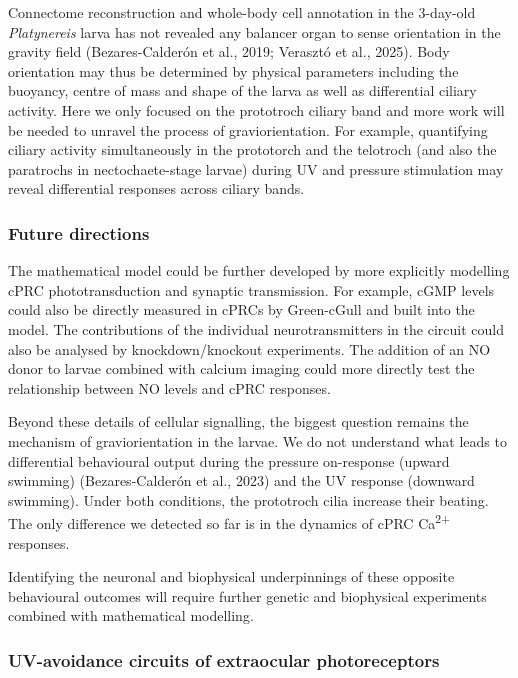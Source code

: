 \documentclass[
  11pt,
  letterpaper,
  DIV=11,
  numbers=noendperiod]{scrartcl}
\begin{document}
Connectome reconstruction and whole-body cell annotation in the
3-day-old \emph{Platynereis} larva has not revealed any balancer organ
to sense orientation in the gravity field (Bezares-Calderón et al.,
2019; Verasztó et al., 2025). Body orientation may thus be determined by
physical parameters including the buoyancy, centre of mass and shape of
the larva as well as differential ciliary activity. Here we only focused
on the prototroch ciliary band and more work will be needed to unravel
the process of graviorientation. For example, quantifying ciliary
activity simultaneously in the prototorch and the telotroch (and also
the paratrochs in nectochaete-stage larvae) during UV and pressure
stimulation may reveal differential responses across ciliary bands.

\subsubsection{Future directions}\label{future-directions}

The mathematical model could be further developed by more explicitly
modelling cPRC phototransduction and synaptic transmission. For example,
cGMP levels could also be directly measured in cPRCs by Green-cGull and
built into the model. The contributions of the individual
neurotransmitters in the circuit could also be analysed by
knockdown/knockout experiments. The addition of an NO donor to larvae
combined with calcium imaging could more directly test the relationship
between NO levels and cPRC responses.

Beyond these details of cellular signalling, the biggest question
remains the mechanism of graviorientation in the larvae. We do not
understand what leads to differential behavioural output during the
pressure on-response (upward swimming) (Bezares-Calderón et al., 2023)
and the UV response (downward swimming). Under both conditions, the
prototroch cilia increase their beating. The only difference we detected
so far is in the dynamics of cPRC Ca\textsuperscript{2+} responses.

Identifying the neuronal and biophysical underpinnings of these opposite
behavioural outcomes will require further genetic and biophysical
experiments combined with mathematical modelling.

\subsubsection{UV-avoidance circuits of extraocular
photoreceptors}\label{uv-avoidance-circuits-of-extraocular-photoreceptors}
\end{document}
